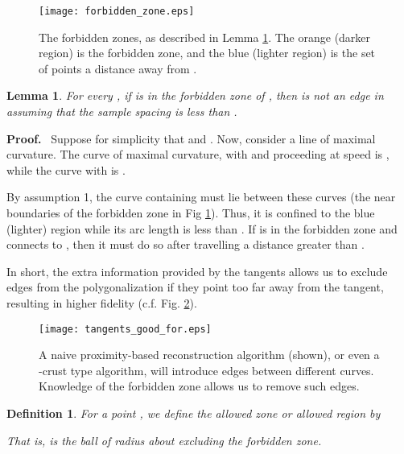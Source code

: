 \documentclass{article}
\newtheorem{definition}[cntr]{Definition}
\newenvironment{proof}{
  \noindent\textbf{Proof.}\ }{\hspace*{\fill}
  \medskip}
\newtheorem{lemma}[cntr]{Lemma}
\numberwithin{cntr}{section}
\numberwithin{equation}{section}
\begin{document}
\begin{figure}
\setlength{\unitlength}{0.240900pt}
\ifx\plotpoint\undefined\newsavebox{\plotpoint}\fi
\sbox{\plotpoint}{\rule[-0.200pt]{0.400pt}{0.400pt}}\texttt{[image: forbidden\_zone.eps]}
\caption{The forbidden zones, as described in Lemma \ref{lem:forbiddenZone}.
The orange (darker region) is the forbidden zone, and the blue (lighter region)
is the set of points a distance  away from .}
\label{fig:forbiddenZone}
\end{figure}

\begin{lemma}
\label{lem:forbiddenZone}
For every , if  is in the forbidden zone of ,
then  is not an edge in  assuming that the
sample spacing is less than .
\end{lemma}

\begin{proof}
Suppose for simplicity that  and . Now, consider a line  of maximal curvature. The curve of maximal curvature, with  and proceeding at speed  is , while the curve with  is .

By assumption 1, the curve  containing 
must lie between these curves (the near boundaries of the forbidden zone
in Fig \ref{lem:forbiddenZone}). Thus, it is confined to the blue (lighter)
region while its arc length is less than .
If  is in the forbidden zone and
 connects  to , then it must do so after travelling a distance greater than .
\end{proof}

In short, the extra information provided by the tangents
allows us to exclude edges from the polygonalization if they point too far away
from the tangent, resulting in higher fidelity (c.f. Fig. \ref{fig:proximityVsTangentBased}).

\begin{figure}
\setlength{\unitlength}{0.240900pt}
\ifx\plotpoint\undefined\newsavebox{\plotpoint}\fi
\sbox{\plotpoint}{\rule[-0.200pt]{0.400pt}{0.400pt}}\texttt{[image: tangents\_good\_for.eps]}

\caption{A naive proximity-based reconstruction algorithm (shown),
or even a -crust type algorithm, will introduce edges
between different curves. Knowledge of the forbidden zone allows us to
remove such edges.}
\label{fig:proximityVsTangentBased}
\end{figure}

\begin{definition}
  \label{def:AllowedRegion}
For a point , we define the \emph{allowed zone} or
\emph{allowed region}  by
  
  That is,  is the ball of radius  about  excluding the forbidden zone.
\end{definition}
\end{document}
